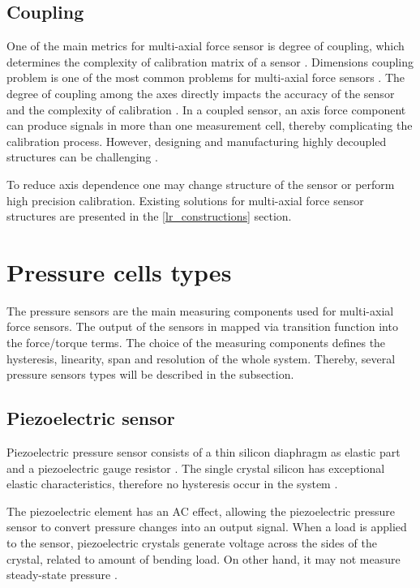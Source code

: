 \subsection{Coupling}
\label{lr_coupling}

One of the main metrics for multi-axial force sensor is degree of coupling, which determines the complexity of calibration matrix of a sensor 
\cite{decoupling_sliding_structure,multi_axis_force_sensors_review,CHAO1997105}. 
Dimensions coupling problem is one of the most common problems for multi-axial force sensors \cite{NN_decoupling}.
The degree of coupling among the axes directly impacts the accuracy of the sensor and the complexity of calibration 
\cite{decoupling_sliding_structure, multi_axis_force_sensors_review, CHAO1997105}. 
In a coupled sensor, an axis force component can produce signals in more than one measurement cell, 
thereby complicating the calibration process. However, designing and manufacturing highly decoupled structures can be challenging 
\cite{shape_optimization_decoupled}.

To reduce axis dependence one may change structure of the sensor or perform high precision calibration. 
Existing solutions for multi-axial force sensor structures are presented in the \ref{lr_constructions} section.


\section{Pressure cells types}
\label{lr_pressure_cell_types}
The pressure sensors are the main measuring components used for multi-axial force sensors. The output of the sensors in mapped via transition function into the force/torque terms. 
The choice of the measuring components defines the hysteresis, linearity, span and resolution of the whole system. 
Thereby, several pressure sensors types will be described in the subsection.

\subsection{Piezoelectric sensor}
Piezoelectric pressure sensor consists of a thin silicon diaphragm as elastic part and a piezoelectric gauge resistor \cite{handbook_sensors}.
The single crystal silicon has exceptional elastic characteristics, therefore no hysteresis occur in the system \cite{handbook_sensors}.

The piezoelectric element has an AC effect, allowing the piezoelectric pressure sensor to convert pressure changes into an output signal. 
When a load is applied to the sensor, piezoelectric crystals generate voltage across the sides of the crystal, related to amount of bending load.
On other hand, it may not measure steady-state pressure \cite{handbook_sensors}. 

